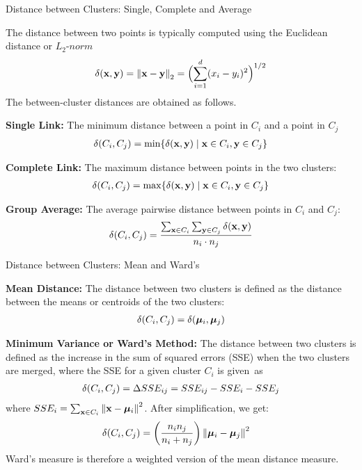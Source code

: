 \begin{frame}{Distance between Clusters: Single, Complete and Average}

The distance between two points is 
typically computed using the Euclidean distance or $L_2\text{-}norm$
\begin{align*}
  \delta(\mathbf{x}, \mathbf{y}) = \left\lVert\mathbf{x} - \mathbf{y}\right\rVert_2 = \Bigl(\sum_{i=1}^d (x_i -
y_i)^2\Bigr)^{1/2}
\end{align*}
The between-cluster distances are obtained as follows.

\medskip
{\bf Single Link:}
The minimum distance between a point in
$C_i$ and a point in $C_{j}$
\begin{align*}
  \delta(C_{i},C_{j}) = \min \{\delta(\mathbf{x},\mathbf{y}) \mid \mathbf{x} \in C_{i},
  \mathbf{y} \in C_{j}\}
\end{align*}

\medskip
{\bf Complete Link:}
The maximum distance between points
in the two clusters:
\begin{align*}
  \delta(C_{i},C_{j}) = \max \{\delta(\mathbf{x},\mathbf{y}) \mid \mathbf{x} \in C_{i},
  \mathbf{y} \in C_{j} \}
\end{align*}

{\bf Group Average:}
The average pairwise distance between points in
$C_i$ and $C_{j}$:
\begin{align*}
  \delta(C_{i},C_{j}) = \frac{\sum_{\mathbf{x} \in C_{i}} \sum_{\mathbf{y} \in
  C_{j}}
  \delta(\mathbf{x},\mathbf{y})}{n_i \cdot n_{j}}
\end{align*}
\end{frame}


\begin{frame}{Distance between Clusters: Mean and Ward's}

{\bf Mean Distance:}
The distance between two clusters
is def\/{i}ned as the distance between the means or
centroids of the two clusters:
\begin{align*}
\delta(C_{i},C_{j}) = \delta({\bm \mu}_i,{\bm \mu}_{j})
\end{align*}

\medskip
{\bf Minimum Variance or Ward's Method:}
The distance between two clusters is
def\/{i}ned as the increase in the sum of squared errors (SSE) when the two
clusters are merged, where the SSE for a given cluster $C_i$ is given~as
\begin{align*}
    \delta(C_{i},C_{j}) =
    \Delta SSE_{ij} = SSE_{ij} - SSE_i - SSE_{j}
\end{align*}
where $SSE_i = \sum_{\mathbf{x} \in C_i} \left\lVert\mathbf{x} - {\bm \mu}_i\right\rVert^2$. After
simplification, we get:
\begin{align*}
    \delta(C_{i},C_{j}) 
    & = \left(n_i n_{j} \over n_i + n_{j}\right)
    \left\lVert{\bm \mu}_i-{\bm \mu}_{j}\right\rVert^2
\end{align*}
Ward's measure is therefore a weighted version of
the mean distance measure.
\end{frame}



